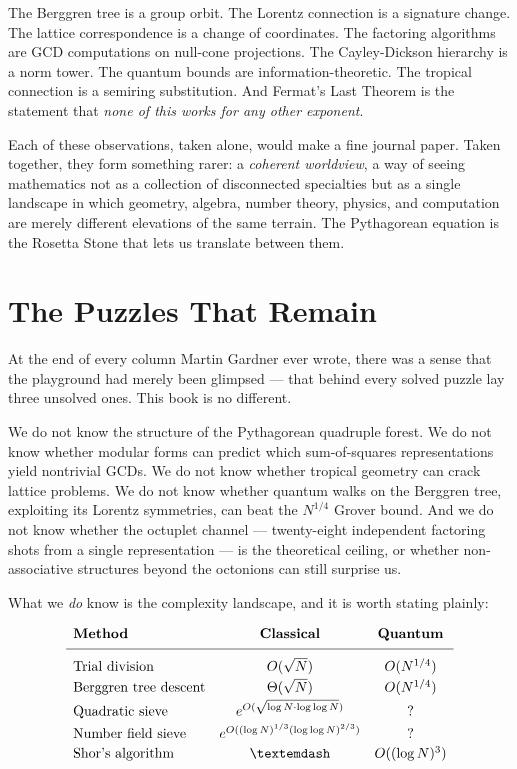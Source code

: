 The Berggren tree is a group orbit. The Lorentz connection is a signature change. The lattice correspondence is a change of coordinates. The factoring algorithms are GCD computations on null-cone projections. The Cayley-Dickson hierarchy is a norm tower. The quantum bounds are information-theoretic. The tropical connection is a semiring substitution. And Fermat's Last Theorem is the statement that \emph{none of this works for any other exponent}.

Each of these observations, taken alone, would make a fine journal paper. Taken together, they form something rarer: a \emph{coherent worldview}, a way of seeing mathematics not as a collection of disconnected specialties but as a single landscape in which geometry, algebra, number theory, physics, and computation are merely different elevations of the same terrain. The Pythagorean equation is the Rosetta Stone that lets us translate between them.



\section{The Puzzles That Remain}\label{concl-the-puzzles-that-remain}

At the end of every column Martin Gardner ever wrote, there was a sense that the playground had merely been glimpsed --- that behind every solved puzzle lay three unsolved ones. This book is no different.

We do not know the structure of the Pythagorean quadruple forest. We do not know whether modular forms can predict which sum-of-squares representations yield nontrivial GCDs. We do not know whether tropical geometry can crack lattice problems. We do not know whether quantum walks on the Berggren tree, exploiting its Lorentz symmetries, can beat the \(N^{1/4}\) Grover bound. And we do not know whether the octuplet channel --- twenty-eight independent factoring shots from a single representation --- is the theoretical ceiling, or whether non-associative structures beyond the octonions can still surprise us.

What we \emph{do} know is the complexity landscape, and it is worth stating plainly:

\[
\begin{array}{lcc}
\textbf{Method} & \textbf{Classical} & \textbf{Quantum} \\[4pt]
\hline
\\[-6pt]
\text{Trial division} & O(\sqrt{N}) & O(N^{1/4}) \\[2pt]
\text{Berggren tree descent} & \Theta(\sqrt{N}) & O(N^{1/4}) \\[2pt]
\text{Quadratic sieve} & e^{O(\sqrt{\log N \cdot \log\log N})} & ? \\[2pt]
\text{Number field sieve} & e^{O((\log N)^{1/3}(\log\log N)^{2/3})} & ? \\[2pt]
\text{Shor's algorithm} & — & O((\log N)^3) \\[2pt]
\end{array}
\]

